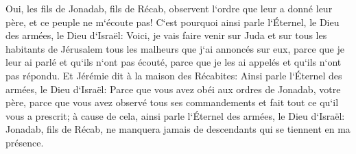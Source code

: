 \verse Oui, les fils de Jonadab, fils de Récab, observent l`ordre que leur a donné leur père, et ce peuple ne m`écoute pas! 
\verse C`est pourquoi ainsi parle l`Éternel, le Dieu des armées, le Dieu d`Israël: Voici, je vais faire venir sur Juda et sur tous les habitants de Jérusalem tous les malheurs que j`ai annoncés sur eux, parce que je leur ai parlé et qu`ils n`ont pas écouté, parce que je les ai appelés et qu`ils n`ont pas répondu. 
\verse Et Jérémie dit à la maison des Récabites: Ainsi parle l`Éternel des armées, le Dieu d`Israël: Parce que vous avez obéi aux ordres de Jonadab, votre père, parce que vous avez observé tous ses commandements et fait tout ce qu`il vous a prescrit; 
\verse à cause de cela, ainsi parle l`Éternel des armées, le Dieu d`Israël: Jonadab, fils de Récab, ne manquera jamais de descendants qui se tiennent en ma présence. 

